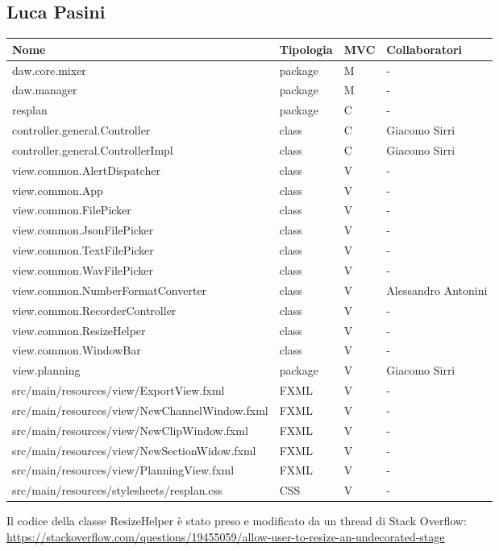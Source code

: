 \documentclass[a4paper,12pt]{report}
\begin{document}
\subsection{Luca Pasini}
\begin{center}
\begin{longtable}{| m{22.5em} | m{2cm}| m{1cm} | m{2.7cm} |} 
 \hline
   \textbf{Nome} & \textbf{Tipologia} & \textbf{MVC} & \textbf{Collaboratori} \\ [0.5ex] 
\hline
daw.core.mixer & package & M & - \\
\hline
daw.manager & package & M & - \\
\hline
resplan & package & C & - \\
\hline
controller.general.Controller & class & C & Giacomo Sirri \\
\hline
controller.general.ControllerImpl & class & C & Giacomo Sirri \\
\hline
view.common.AlertDispatcher & class & V & - \\
\hline
view.common.App & class & V & - \\
\hline
view.common.FilePicker & class & V & - \\
\hline
view.common.JsonFilePicker & class & V & - \\
\hline
view.common.TextFilePicker & class & V & - \\
\hline
view.common.WavFilePicker & class & V & - \\
\hline 
view.common.NumberFormatConverter & class & V & Alessandro Antonini \\
\hline
view.common.RecorderController & class & V & - \\
\hline
view.common.ResizeHelper & class & V & - \\
\hline
view.common.WindowBar & class & V & - \\
\hline
view.planning & package & V & Giacomo Sirri \\
\hline
src/main/resources/view/ExportView.fxml & FXML & V & - \\
\hline
src/main/resources/view/NewChannelWindow.fxml & FXML & V & - \\
\hline
src/main/resources/view/NewClipWindow.fxml & FXML & V & - \\
\hline
src/main/resources/view/NewSectionWidow.fxml & FXML & V & - \\
\hline
src/main/resources/view/PlanningView.fxml & FXML & V & - \\
\hline
src/main/resources/stylesheets/resplan.css & CSS & V & - \\
\hline
\end{longtable}
\end{center}
Il codice della classe ResizeHelper è stato preso e modificato da un thread di Stack Overflow:
\href{https://stackoverflow.com/questions/19455059/allow-user-to-resize-an-undecorated-stage}{https://stackoverflow.com/questions/19455059/allow-user-to-resize-an-undecorated-stage}
\end{document}
